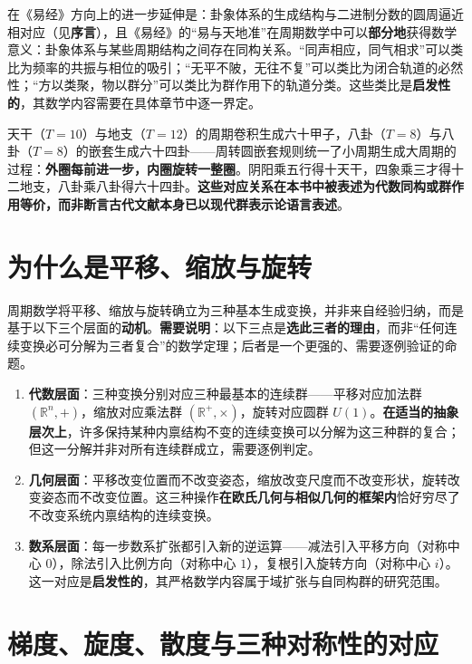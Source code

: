 在《易经》方向上的进一步延伸是：卦象体系的生成结构与二进制分数的圆周逼近相对应（见\textbf{序言}），且《易经》的“易与天地准”在周期数学中可以\textbf{部分地}获得数学意义：卦象体系与某些周期结构之间存在同构关系。“同声相应，同气相求”可以类比为频率的共振与相位的吸引；“无平不陂，无往不复”可以类比为闭合轨道的必然性；“方以类聚，物以群分”可以类比为群作用下的轨道分类。这些类比是\textbf{启发性的}，其数学内容需要在具体章节中逐一界定。

天干（$T=10$）与地支（$T=12$）的周期卷积生成六十甲子，八卦（$T=8$）与八卦（$T=8$）的嵌套生成六十四卦——周转圆嵌套规则统一了小周期生成大周期的过程：\textbf{外圈每前进一步，内圈旋转一整圈}。阴阳乘五行得十天干，四象乘三才得十二地支，八卦乘八卦得六十四卦。\textbf{这些对应关系在本书中被表述为代数同构或群作用等价，而非断言古代文献本身已以现代群表示论语言表述}。

\section*{为什么是平移、缩放与旋转}

周期数学将平移、缩放与旋转确立为三种基本生成变换，并非来自经验归纳，而是基于以下三个层面的\textbf{动机}。\textbf{需要说明}：以下三点是\textbf{选此三者的理由}，而非“任何连续变换必可分解为三者复合”的数学定理；后者是一个更强的、需要逐例验证的命题。

\begin{enumerate}[label=(\roman*)]
    \item \textbf{代数层面}：三种变换分别对应三种最基本的连续群——平移对应加法群 $(\mathbb{R}^n,+)$，缩放对应乘法群 $(\mathbb{R}^+,\times)$，旋转对应圆群 $U(1)$。\textbf{在适当的抽象层次上}，许多保持某种内禀结构不变的连续变换可以分解为这三种群的复合；但这一分解并非对所有连续群成立，需要逐例判定。
    \item \textbf{几何层面}：平移改变位置而不改变姿态，缩放改变尺度而不改变形状，旋转改变姿态而不改变位置。这三种操作\textbf{在欧氏几何与相似几何的框架内}恰好穷尽了不改变系统内禀结构的连续变换。
    \item \textbf{数系层面}：每一步数系扩张都引入新的逆运算——减法引入平移方向（对称中心 $0$），除法引入比例方向（对称中心 $1$），复根引入旋转方向（对称中心 $i$）。这一对应是\textbf{启发性的}，其严格数学内容属于域扩张与自同构群的研究范围。
\end{enumerate}

\section*{梯度、旋度、散度与三种对称性的对应}


